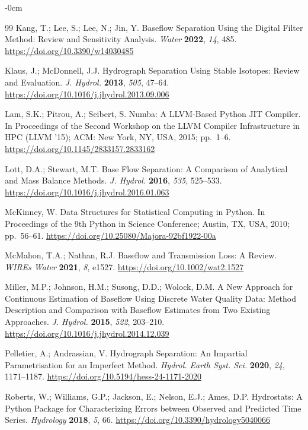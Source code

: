 \documentclass[hydrology,article,submit,pdftex,moreauthors]{Definitions/mdpi}
\begin{document}
\begin{adjustwidth}{-\extralength}{0cm}
\begin{thebibliography}{99}
Kang, T.; Lee, S.; Lee, N.; Jin, Y. Baseflow Separation Using the Digital Filter Method: Review and Sensitivity Analysis. \textit{Water} \textbf{2022}, \textit{14}, 485. \url{https://doi.org/10.3390/w14030485}

Klaus, J.; McDonnell, J.J. Hydrograph Separation Using Stable Isotopes: Review and Evaluation. \textit{J. Hydrol.} \textbf{2013}, \textit{505}, 47--64. \url{https://doi.org/10.1016/j.jhydrol.2013.09.006}

Lam, S.K.; Pitrou, A.; Seibert, S. Numba: A LLVM-Based Python JIT Compiler. In Proceedings of the Second Workshop on the LLVM Compiler Infrastructure in HPC (LLVM '15); ACM: New York, NY, USA, 2015; pp.~1--6. \url{https://doi.org/10.1145/2833157.2833162}

Lott, D.A.; Stewart, M.T. Base Flow Separation: A Comparison of Analytical and Mass Balance Methods. \textit{J. Hydrol.} \textbf{2016}, \textit{535}, 525--533. \url{https://doi.org/10.1016/j.jhydrol.2016.01.063}

McKinney, W. Data Structures for Statistical Computing in Python. In Proceedings of the 9th Python in Science Conference; Austin, TX, USA, 2010; pp.~56--61. \url{https://doi.org/10.25080/Majora-92bf1922-00a}

McMahon, T.A.; Nathan, R.J. Baseflow and Transmission Loss: A Review. \textit{WIREs Water} \textbf{2021}, \textit{8}, e1527. \url{https://doi.org/10.1002/wat2.1527}

Miller, M.P.; Johnson, H.M.; Susong, D.D.; Wolock, D.M. A New Approach for Continuous Estimation of Baseflow Using Discrete Water Quality Data: Method Description and Comparison with Baseflow Estimates from Two Existing Approaches. \textit{J. Hydrol.} \textbf{2015}, \textit{522}, 203--210. \url{https://doi.org/10.1016/j.jhydrol.2014.12.039}

Pelletier, A.; Andrassian, V. Hydrograph Separation: An Impartial Parametrisation for an Imperfect Method. \textit{Hydrol. Earth Syst. Sci.} \textbf{2020}, \textit{24}, 1171--1187. \url{https://doi.org/10.5194/hess-24-1171-2020}

Roberts, W.; Williams, G.P.; Jackson, E.; Nelson, E.J.; Ames, D.P. Hydrostats: A Python Package for Characterizing Errors between Observed and Predicted Time Series. \textit{Hydrology} \textbf{2018}, \textit{5}, 66. \url{https://doi.org/10.3390/hydrology5040066}


\end{thebibliography}
\end{adjustwidth}
\end{document}
